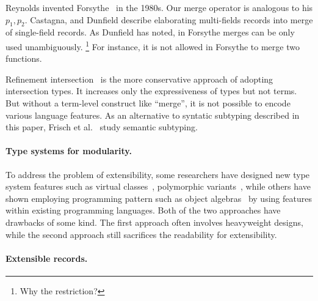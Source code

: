 Reynolds invented Forsythe~\cite{reynolds1997design} in the 1980s. Our merge
operator is analogous to his $ p_1, p_2 $. Castagna, and Dunfield describe
elaborating multi-fields records into merge of single-field records. As Dunfield
has noted, in Forsythe merges can be only used unambiguously. \footnote{Why the
  restriction?} For instance, it is not allowed in Forsythe to merge two
functions.



Refinement
intersection~\cite{dunfield2007refined,davies2005practical,freeman1991refinement}
is the more conservative approach of adopting intersection types. It increases
only the expressiveness of types but not terms. But without a term-level
construct like ``merge'', it is not possible to encode various language
features. As an alternative to syntatic subtyping described in this paper,
Frisch et al.~\cite{frisch2008semantic} study semantic subtyping.

\paragraph{Type systems for modularity.}

To address the problem of extensibility, some researchers have designed new type
system features such as virtual classes~\cite{ernst2006virtual}, polymorphic
variants~\cite{garrigue1998programming}, while others have shown employing
programming pattern such as object algebras~\cite{oliveira2012extensibility} by
using features within existing programming languages. Both of the two approaches
have drawbacks of some kind. The first approach often involves heavyweight
designs, while the second approach still sacrifices the readability for
extensibility.


\paragraph{Extensible records.}

